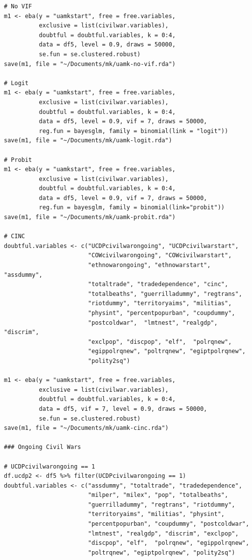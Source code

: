 \documentclass[a4paper,12pt]{article}
\begin{document}
\begin{verbatim}
# No VIF
m1 <- eba(y = "uamkstart", free = free.variables,
          exclusive = list(civilwar.variables),
          doubtful = doubtful.variables, k = 0:4,
          data = df5, level = 0.9, draws = 50000,
          se.fun = se.clustered.robust)
save(m1, file = "~/Documents/mk/uamk-no-vif.rda")

# Logit
m1 <- eba(y = "uamkstart", free = free.variables,
          exclusive = list(civilwar.variables),
          doubtful = doubtful.variables, k = 0:4,
          data = df5, level = 0.9, vif = 7, draws = 50000,
          reg.fun = bayesglm, family = binomial(link = "logit"))
save(m1, file = "~/Documents/mk/uamk-logit.rda")

# Probit
m1 <- eba(y = "uamkstart", free = free.variables,
          exclusive = list(civilwar.variables),
          doubtful = doubtful.variables, k = 0:4,
          data = df5, level = 0.9, vif = 7, draws = 50000,
          reg.fun = bayesglm, family = binomial(link="probit"))
save(m1, file = "~/Documents/mk/uamk-probit.rda")

# CINC
doubtful.variables <- c("UCDPcivilwarongoing", "UCDPcivilwarstart",
                        "COWcivilwarongoing", "COWcivilwarstart",
                        "ethnowarongoing", "ethnowarstart", "assdummy",
                        "totaltrade", "tradedependence", "cinc",
                        "totalbeaths", "guerrilladummy", "regtrans",
                        "riotdummy", "territoryaims", "militias",
                        "physint", "percentpopurban", "coupdummy",
                        "postcoldwar",  "lmtnest", "realgdp", "discrim",
                        "exclpop", "discpop", "elf",  "polrqnew",
                        "egippolrqnew", "poltrqnew", "egiptpolrqnew",
                        "polity2sq")

m1 <- eba(y = "uamkstart", free = free.variables,
          exclusive = list(civilwar.variables),
          doubtful = doubtful.variables, k = 0:4,
          data = df5, vif = 7, level = 0.9, draws = 50000,
          se.fun = se.clustered.robust)
save(m1, file = "~/Documents/mk/uamk-cinc.rda")

### Ongoing Civil Wars

# UCDPcivilwarongoing == 1
df.ucdp2 <- df5 %>% filter(UCDPcivilwarongoing == 1)
doubtful.variables <- c("assdummy", "totaltrade", "tradedependence",
                        "milper", "milex", "pop", "totalbeaths",
                        "guerrilladummy", "regtrans", "riotdummy",
                        "territoryaims", "militias", "physint",
                        "percentpopurban", "coupdummy", "postcoldwar",
                        "lmtnest", "realgdp", "discrim", "exclpop",
                        "discpop", "elf",  "polrqnew", "egippolrqnew",
                        "poltrqnew", "egiptpolrqnew", "polity2sq")


\end{verbatim}
\end{document}
